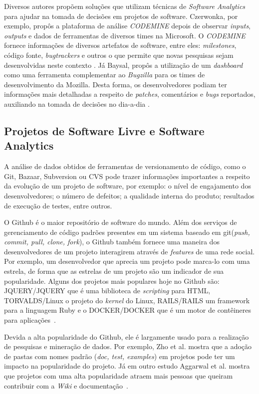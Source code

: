Diversos autores propõem soluções que utilizam técnicas de \textit{Software Analytics} para ajudar na tomada de decisões em projetos de software. Czerwonka, por exemplo, propôs a plataforma de análise \textit{CODEMINE} depois de observar \textit{inputs}, \textit{outputs} e dados de ferramentas de diversos times na Microsoft. O \textit{CODEMINE} fornece informações de diversos artefatos de software, entre eles: \textit{milestones}, código fonte, \textit{bugtrackers} e outros o que permite que novas pesquisas sejam desenvolvidas neste contexto \protect \cite{softwarePrac}. Já Baysal, propôs a utilização de um \textit{dashboard} como uma ferramenta complementar ao \textit{Bugzilla} para os times de desenvolvimento da Mozilla. Desta forma, os desenvolvedores podiam ter informações mais detalhadas a respeito de \textit{patches}, comentários e \textit{bugs} reportados, auxiliando na tomada de decisões no dia-a-dia \protect \cite{softwarePrac}.

\subsection{Projetos de Software Livre e Software Analytics}
\label{ref:sof:sl}
A análise de dados obtidos de ferramentas de versionamento de código, como o Git, Bazaar, Subversion ou CVS pode trazer informações importantes a respeito da evolução de um projeto de software, por exemplo: o nível de engajamento dos desenvolvedores; o número de defeitos; a qualidade interna do produto; resultados de execução de testes, entre outros\cite{artAndScience}. 

O Github é o maior repositório de software do mundo. Além dos serviços de gerenciamento de código padrões presentes em um sistema baseado em git(\textit{push, commit, pull, clone, fork}), o Github também fornece uma maneira dos desenvolvedores de um projeto interagirem através de \textit{features} de uma rede social. Por exemplo, um desenvolvedor que aprecia um projeto pode marca-lo com uma estrela, de forma que as estrelas de um projeto são um indicador de sua popularidade. Alguns dos projetos mais populares hoje no Github são: JQUERY/JQUERY que é uma biblioteca de \textit{scripting} para HTML, TORVALDS/Linux o projeto do \textit{kernel} do Linux, RAILS/RAILS um framework para a linguagem Ruby e o DOCKER/DOCKER que é um motor de contêineres para aplicações~\cite{githubPop}. 

Devida a alta popularidade do Github, ele é largamente usado para a realização de pesquisas e mineração de dados. Por exemplo, Zho et al. mostra que a adoção de pastas com nomes padrão (\textit{doc, test, examples}) em projetos pode ter um impacto na popularidade do projeto. Já em outro estudo Aggarwal et al. mostra que projetos com uma alta popularidade atraem mais pessoas que queiram contribuir com a \textit{Wiki} e documentação~\cite{githubPop}.

